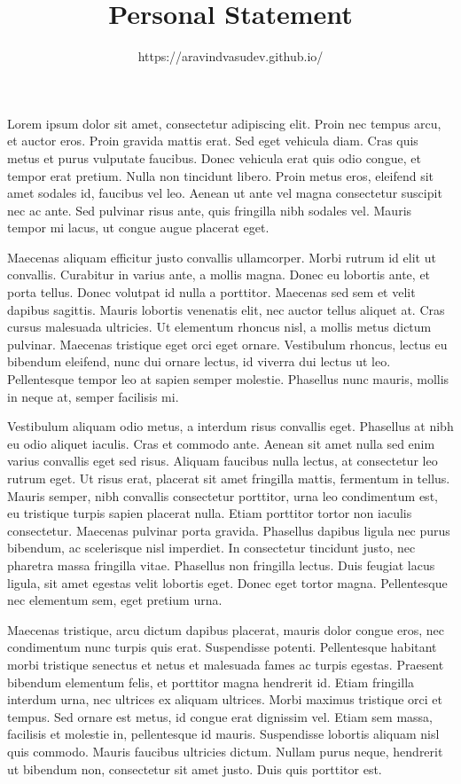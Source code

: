 \documentclass{sop}
\title{Personal Statement}
\author{https://aravindvasudev.github.io/}{Aravind Vasudevan}
\begin{document}
\maketitle


 Lorem ipsum dolor sit amet, consectetur adipiscing elit. Proin nec tempus arcu, et auctor eros. Proin gravida mattis erat. Sed eget vehicula diam. Cras quis metus et purus vulputate faucibus. Donec vehicula erat quis odio congue, et tempor erat pretium. Nulla non tincidunt libero. Proin metus eros, eleifend sit amet sodales id, faucibus vel leo. Aenean ut ante vel magna consectetur suscipit nec ac ante. Sed pulvinar risus ante, quis fringilla nibh sodales vel. Mauris tempor mi lacus, ut congue augue placerat eget.

Maecenas aliquam efficitur justo convallis ullamcorper. Morbi rutrum id elit ut convallis. Curabitur in varius ante, a mollis magna. Donec eu lobortis ante, et porta tellus. Donec volutpat id nulla a porttitor. Maecenas sed sem et velit dapibus sagittis. Mauris lobortis venenatis elit, nec auctor tellus aliquet at. Cras cursus malesuada ultricies. Ut elementum rhoncus nisl, a mollis metus dictum pulvinar. Maecenas tristique eget orci eget ornare. Vestibulum rhoncus, lectus eu bibendum eleifend, nunc dui ornare lectus, id viverra dui lectus ut leo. Pellentesque tempor leo at sapien semper molestie. Phasellus nunc mauris, mollis in neque at, semper facilisis mi.

Vestibulum aliquam odio metus, a interdum risus convallis eget. Phasellus at nibh eu odio aliquet iaculis. Cras et commodo ante. Aenean sit amet nulla sed enim varius convallis eget sed risus. Aliquam faucibus nulla lectus, at consectetur leo rutrum eget. Ut risus erat, placerat sit amet fringilla mattis, fermentum in tellus. Mauris semper, nibh convallis consectetur porttitor, urna leo condimentum est, eu tristique turpis sapien placerat nulla. Etiam porttitor tortor non iaculis consectetur. Maecenas pulvinar porta gravida. Phasellus dapibus ligula nec purus bibendum, ac scelerisque nisl imperdiet. In consectetur tincidunt justo, nec pharetra massa fringilla vitae. Phasellus non fringilla lectus. Duis feugiat lacus ligula, sit amet egestas velit lobortis eget. Donec eget tortor magna. Pellentesque nec elementum sem, eget pretium urna.

Maecenas tristique, arcu dictum dapibus placerat, mauris dolor congue eros, nec condimentum nunc turpis quis erat. Suspendisse potenti. Pellentesque habitant morbi tristique senectus et netus et malesuada fames ac turpis egestas. Praesent bibendum elementum felis, et porttitor magna hendrerit id. Etiam fringilla interdum urna, nec ultrices ex aliquam ultrices. Morbi maximus tristique orci et tempus. Sed ornare est metus, id congue erat dignissim vel. Etiam sem massa, facilisis et molestie in, pellentesque id mauris. Suspendisse lobortis aliquam nisl quis commodo. Mauris faucibus ultricies dictum. Nullam purus neque, hendrerit ut bibendum non, consectetur sit amet justo. Duis quis porttitor est.
\end{document}
